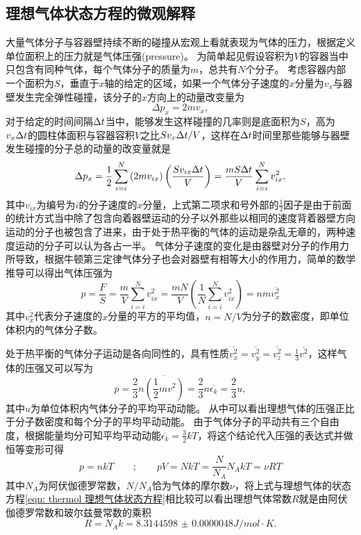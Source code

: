 \subsection{理想气体状态方程的微观解释}
大量气体分子与容器壁持续不断的碰撞从宏观上看就表现为气体的压力，根据定义单位面积上的压力就是气体{\heiti 压强}(pressure)。
为简单起见假设容积为$V$的容器当中只包含有同种气体，每个气体分子的质量为$m$，总共有$N$个分子。
考虑容器内部一个面积为$S$，垂直于$x$轴的给定的区域，如果一个气体分子速度的$x$分量为$v_x$与器壁发生完全弹性碰撞，该分子的$x$方向上的动量改变量为
\begin{equation}
\Delta p_x = 2mv_x,
\end{equation}
对于给定的时间间隔$\Delta t$当中，能够发生这样碰撞的几率则是底面积为$S$，高为$v_x\Delta t$的圆柱体面积与容器容积$V$之比$Sv_x\Delta t/V$，这样在$\Delta t$时间里那些能够与器壁发生碰撞的分子总的动量的改变量就是
\begin{equation}
\Delta p_x = \frac{1}{2}\sum_{i=i}^N\left(2mv_{ix}\right)\left(\frac{Sv_{ix}\Delta t}{V}\right) = \frac{mS\Delta t}{V}\sum_{i=i}^Nv_{ix}^2,
\end{equation}
其中$v_{ix}$为编号为$i$的分子速度的$x$分量，上式第二项求和号外部的$\frac{1}{2}$因子是由于前面的统计方式当中除了包含向着器壁运动的分子以外那些以相同的速度背着器壁方向运动的分子也被包含了进来，由于处于热平衡的气体的运动是杂乱无章的，两种速度运动的分子可以认为各占一半。
气体分子速度的变化是由器壁对分子的作用力所导致，根据牛顿第三定律气体分子也会对器壁有相等大小的作用力，简单的数学推导可以得出气体压强为
\begin{equation}
p = \frac{F}{S} = \frac{m}{V}\sum_{i=i}^Nv_{ix}^2 = \frac{mN}{V}\left(\frac{1}{N}\sum_{i=i}^Nv_{ix}^2\right) = nm\overline{v_x^2}
\end{equation}
其中$\overline{v_x^2}$代表分子速度的$x$分量的平方的平均值，$n=N/V$为分子的数密度，即单位体积内的气体分子数。

处于热平衡的气体分子运动是各向同性的，具有性质$\overline{v_x^2}=\overline{v_y^2}=\overline{v_z^2}=\frac{1}{3}\overline{v^2}$，这样气体的压强又可以写为
\begin{equation}
p = \frac{2}{3}n\overline{\left(\frac{1}{2}mv^2\right)} = \frac{2}{3}n\overline{\epsilon_k} = \frac{2}{3}u,
\end{equation}
其中$u$为单位体积内气体分子的平均平动动能。
从中可以看出理想气体的压强正比于分子数密度和每个分子的平均平动动能。
由于气体分子的平动共有三个自由度，根据能量均分可知平均平动动能$\overline{\epsilon_k}=\frac{3}{2}kT$，将这个结论代入压强的表达式并做恒等变形可得
\begin{equation}
p = nkT \qquad;\qquad pV = NkT = \frac{N}{N_A}N_AkT = \nu RT
\end{equation}
其中$N_A$为阿伏伽德罗常数，$N/N_A$恰为气体的摩尔数$\nu$，将上式与理想气体的状态方程\ref{eqn: thermol 理想气体状态方程}相比较可以看出理想气体常数$R$就是由阿伏伽德罗常数和玻尔兹曼常数的乘积
\begin{equation}
R=N_A k= \num{8.3144598(48)}\si{J/mol \cdot K}.
\end{equation}

